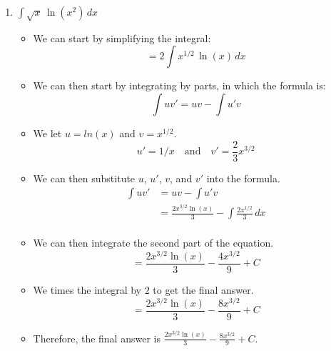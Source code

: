 \documentclass[12pt]{article}
\begin{document}
\begin{enumerate}[leftmargin=\labelsep]
\begin{enumerate}
        \newpage
        \item $\displaystyle{\int \sqrt{x} \, \ln(x^2) \, dx}$
        \begin{itemize}[label={}]
            \item We can start by simplifying the integral:
            \begin{equation*}
                = 2 \int x^{1/2} \, \ln(x) \, dx
            \end{equation*}
            \item We can then start by integrating by parts, in which the formula is:
            \begin{equation*}
                \int uv' = uv - \int u'v
            \end{equation*}
            \item We let $u=ln(x)$ and $v=x^{1/2}$.
            \begin{equation*}
                u' = 1/x \quad \text{and} \quad v' = \frac{2}{3} x^{3/2}
            \end{equation*}
            \item We can then substitute $u$, $u'$, $v$, and $v'$ into the formula.
            \begin{equation*}
                \begin{split}
                    \int uv' &= uv - \int u'v \\
                    &= \frac{2x^{3/2}\ln(x)}{3} - \int \frac{2x^{1/2}}{3} \, dx \\
                \end{split}
            \end{equation*}
            \item We can then integrate the second part of the equation.
            \begin{equation*}
                = \frac{2x^{3/2}\ln(x)}{3} - \frac{4x^{3/2}}{9} + C
            \end{equation*}
            \item We times the integral by $2$ to get the final answer.
            \begin{equation*}
                = \frac{2x^{3/2}\ln(x)}{3} - \frac{8x^{3/2}}{9} + C
            \end{equation*}
            \item Therefore, the final answer is $\displaystyle{\frac{2x^{3/2}\ln(x)}{3} - \frac{8x^{3/2}}{9} + C}$.
        \end{itemize}


\end{enumerate}
\end{enumerate}
\end{document}
